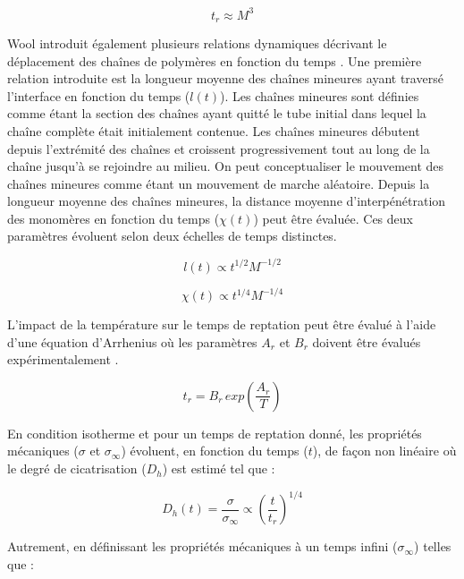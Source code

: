 \begin{equation}
t_r \approx M^3
\end{equation}

Wool introduit également plusieurs relations dynamiques décrivant le déplacement des chaînes de polymères en fonction du temps \cite{Wool1983,Wool1989}. 
Une première relation introduite est la longueur moyenne des chaînes mineures ayant traversé l'interface en fonction du temps ($l(t)$). 
Les chaînes mineures sont définies comme étant la section des chaînes ayant quitté le tube initial dans lequel la chaîne complète était initialement contenue. 
Les chaînes mineures débutent depuis l'extrémité des chaînes et croissent progressivement tout au long de la chaîne jusqu'à se rejoindre au milieu. 
On peut conceptualiser le mouvement des chaînes mineures comme étant un mouvement de marche aléatoire. 
Depuis la longueur moyenne des chaînes mineures, la distance moyenne d'interpénétration des monomères en fonction du temps ($\chi(t)$) peut être évaluée. 
Ces deux paramètres évoluent selon deux échelles de temps distinctes. 

\begin{equation}
l(t) \propto t^{1/2} M^{-1/2}
\end{equation}

\begin{equation}
\chi(t) \propto t^{1/4} M^{-1/4}
\end{equation}

L'impact de la température sur le temps de reptation peut être évalué à l'aide d'une équation d'Arrhenius où les paramètres $A_r$ et $B_r$  doivent être évalués expérimentalement \cite{Bastien1991,Ageorges1998}. 

\begin{equation}
t_r = B_r \, exp \left( \frac{A_r}{T} \right)
\end{equation}

En condition isotherme et pour un temps de reptation donné, les propriétés mécaniques ($\sigma$ et $\sigma_{\infty}$) évoluent, en fonction du temps ($t$), de façon non linéaire où le degré de cicatrisation ($D_{h}$) est estimé tel que \cite{F.Yang2002} : 

\begin{equation}
D_h \left( t \right) = \frac{\sigma}{\sigma_{\infty}} \propto \left( \frac{t}{t_r} \right)^{1/4}
\end{equation}

Autrement, en définissant les propriétés mécaniques à un temps infini ($\sigma_{\infty}$) telles que \cite{Wool1983} :

